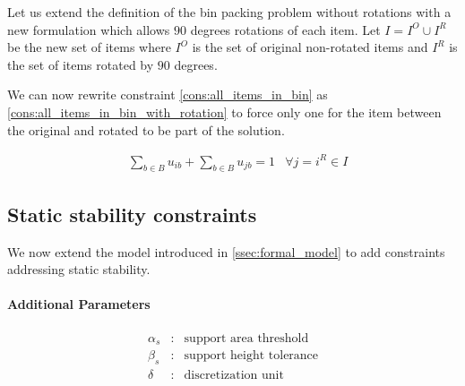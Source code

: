 Let us extend the definition of the bin packing problem without rotations with a new formulation which allows $90$ degrees rotations of each item.
Let $I = I^O \cup I^R$ be the new set of items where $I^O$ is the set of original non-rotated items and $I^R$ is the set of items rotated by $90$ degrees.

We can now rewrite constraint \ref{cons:all_items_in_bin} as \ref{cons:all_items_in_bin_with_rotation} to force only one for the item between the original and rotated to be part of the solution.

\begin{eqnarray}
    & \sum\limits_{b \in B} u_{ib} + \sum\limits_{b \in B} u_{jb} = 1 & \forall j = i^R \in I \label{cons:all_items_in_bin_with_rotation}
\end{eqnarray}

\subsection*{Static stability constraints}

We now extend the model introduced in \cref{ssec:formal_model} to add constraints addressing static stability.

\paragraph*{Additional Parameters}
\begin{eqnarray*}
    \alpha_s  &:& \text{support area threshold} \\
    \beta_s  &:& \text{support height tolerance} \\
    \delta      &:& \text{discretization unit} \\
\end{eqnarray*}

